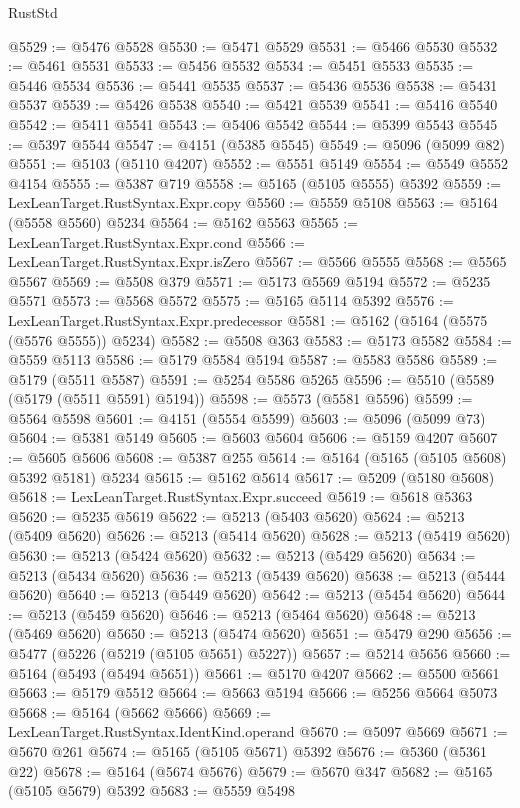 \begin{lexlean}{RustStd}
\begin{coremodule}
@5529 := @5476 @5528
@5530 := @5471 @5529
@5531 := @5466 @5530
@5532 := @5461 @5531
@5533 := @5456 @5532
@5534 := @5451 @5533
@5535 := @5446 @5534
@5536 := @5441 @5535
@5537 := @5436 @5536
@5538 := @5431 @5537
@5539 := @5426 @5538
@5540 := @5421 @5539
@5541 := @5416 @5540
@5542 := @5411 @5541
@5543 := @5406 @5542
@5544 := @5399 @5543
@5545 := @5397 @5544
@5547 := @4151 (@5385 @5545)
@5549 := @5096 (@5099 @82)
@5551 := @5103 (@5110 @4207)
@5552 := @5551 @5149
@5554 := @5549 @5552 @4154
@5555 := @5387 @719
@5558 := @5165 (@5105 @5555) @5392
@5559 := LexLeanTarget.RustSyntax.Expr.copy
@5560 := @5559 @5108
@5563 := @5164 (@5558 @5560) @5234
@5564 := @5162 @5563
@5565 := LexLeanTarget.RustSyntax.Expr.cond
@5566 := LexLeanTarget.RustSyntax.Expr.isZero
@5567 := @5566 @5555
@5568 := @5565 @5567
@5569 := @5508 @379
@5571 := @5173 @5569 @5194
@5572 := @5235 @5571
@5573 := @5568 @5572
@5575 := @5165 @5114 @5392
@5576 := LexLeanTarget.RustSyntax.Expr.predecessor
@5581 := @5162 (@5164 (@5575 (@5576 @5555)) @5234)
@5582 := @5508 @363
@5583 := @5173 @5582
@5584 := @5559 @5113
@5586 := @5179 @5584 @5194
@5587 := @5583 @5586
@5589 := @5179 (@5511 @5587)
@5591 := @5254 @5586 @5265
@5596 := @5510 (@5589 (@5179 (@5511 @5591) @5194))
@5598 := @5573 (@5581 @5596)
@5599 := @5564 @5598
@5601 := @4151 (@5554 @5599)
@5603 := @5096 (@5099 @73)
@5604 := @5381 @5149
@5605 := @5603 @5604
@5606 := @5159 @4207
@5607 := @5605 @5606
@5608 := @5387 @255
@5614 := @5164 (@5165 (@5105 @5608) @5392 @5181) @5234
@5615 := @5162 @5614
@5617 := @5209 (@5180 @5608)
@5618 := LexLeanTarget.RustSyntax.Expr.succeed
@5619 := @5618 @5363
@5620 := @5235 @5619
@5622 := @5213 (@5403 @5620)
@5624 := @5213 (@5409 @5620)
@5626 := @5213 (@5414 @5620)
@5628 := @5213 (@5419 @5620)
@5630 := @5213 (@5424 @5620)
@5632 := @5213 (@5429 @5620)
@5634 := @5213 (@5434 @5620)
@5636 := @5213 (@5439 @5620)
@5638 := @5213 (@5444 @5620)
@5640 := @5213 (@5449 @5620)
@5642 := @5213 (@5454 @5620)
@5644 := @5213 (@5459 @5620)
@5646 := @5213 (@5464 @5620)
@5648 := @5213 (@5469 @5620)
@5650 := @5213 (@5474 @5620)
@5651 := @5479 @290
@5656 := @5477 (@5226 (@5219 (@5105 @5651) @5227))
@5657 := @5214 @5656
@5660 := @5164 (@5493 (@5494 @5651))
@5661 := @5170 @4207
@5662 := @5500 @5661
@5663 := @5179 @5512
@5664 := @5663 @5194
@5666 := @5256 @5664 @5073
@5668 := @5164 (@5662 @5666)
@5669 := LexLeanTarget.RustSyntax.IdentKind.operand
@5670 := @5097 @5669
@5671 := @5670 @261
@5674 := @5165 (@5105 @5671) @5392
@5676 := @5360 (@5361 @22)
@5678 := @5164 (@5674 @5676)
@5679 := @5670 @347
@5682 := @5165 (@5105 @5679) @5392
@5683 := @5559 @5498

\end{coremodule}
\end{lexlean}
